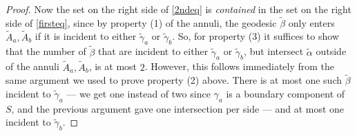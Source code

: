 \documentclass[11pt]{amsart}
\theoremstyle{remark}
\numberwithin{equation}{section}
\begin{document}
\begin{proof}

Now  the set on the right side of \eqref{2ndeq} is \emph{contained} in the set on the right side of \eqref{firsteq}, since by property (1) of the annuli, the geodesic $\tilde \beta$ only enters $\tilde A_a,\tilde A_b$ if it is incident to either $\tilde \gamma_a$ or $\tilde \gamma_b$. So, for property (3) it suffices to show that the number of $\tilde \beta$  that are incident to either $\tilde \gamma_a$ or $\tilde \gamma_b$, but intersect $\tilde \alpha$  outside of the annuli $\tilde A_a,\tilde A_b$, is at most $2$. However, this follows immediately from the same argument we used to prove property (2) above. There is at most one such $\tilde \beta$  incident to $\tilde \gamma_a$ --- we get one instead of two since $\gamma_a$ is a boundary component of $S$, and the previous argument gave one intersection per side ---  and at most one incident to $\tilde \gamma_b$.\end{proof}
\end{document}
